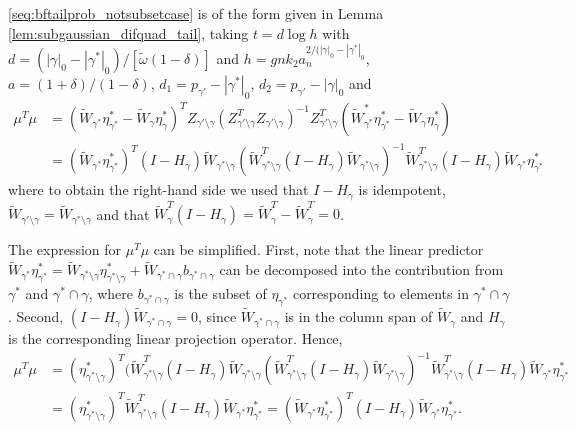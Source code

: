 \eqref{seq:bftailprob_notsubsetcase} is of the form given in Lemma \ref{lem:subgaussian_difquad_tail}, taking 
$t= d \log h$ with $d=(|\gamma|_0-|\gamma^*|_0)/[\tilde{\omega}(1-\delta)]$ and $h=gnk_2 a_n^{2/(|\gamma|_0-|\gamma^*|_0}$,
$a=(1+\delta)/(1-\delta)$, $d_1=p_{\gamma'}-|\gamma^*|_0$, $d_2=p_{\gamma'} - |\gamma|_0$ and
\begin{align}
 \mu^T\mu&= 
(\widetilde{W}_{\gamma^*} \eta_{\gamma^*}^* - \widetilde{W}_\gamma \eta_\gamma^*)^T Z_{\gamma' \setminus \gamma}
(Z_{\gamma' \setminus \gamma}^T Z_{\gamma' \setminus \gamma})^{-1} 
Z_{\gamma' \setminus \gamma}^T (\widetilde{W}_{\gamma^*}^* \eta_{\gamma^*}^* - \widetilde{W}_\gamma \eta_\gamma^*)
\nonumber \\
&=(\widetilde{W}_{\gamma^*} \eta_{\gamma^*}^*)^T (I-H_\gamma) \widetilde{W}_{\gamma^* \setminus \gamma}
(\widetilde{W}_{\gamma^* \setminus \gamma}^T (I- H_\gamma) \widetilde{W}_{\gamma^* \setminus \gamma})^{-1} 
\widetilde{W}_{\gamma^* \setminus \gamma}^T (I - H_\gamma) \widetilde{W}_{\gamma^*} \eta_{\gamma^*}^*
\nonumber
\end{align}
where to obtain the right-hand side we used that $I-H_\gamma$ is idempotent, $\widetilde{W}_{\gamma' \setminus \gamma}= \widetilde{W}_{\gamma^* \setminus \gamma}$ and that $\widetilde{W}_\gamma^T (I - H_\gamma)= \widetilde{W}_\gamma^T - \widetilde{W}_\gamma^T= 0$.

The expression for $\mu^T\mu$ can be simplified. First, note that the linear predictor $\widetilde{W}_{\gamma^*} \eta_{\gamma^*}^*= \widetilde{W}_{\gamma^* \setminus \gamma} \eta_{\gamma^* \setminus \gamma}^* + \widetilde{W}_{\gamma^* \cap \gamma} b_{\gamma^* \cap \gamma}$ can be decomposed into the contribution from $\gamma^*$ and $\gamma^* \cap \gamma$, where $b_{\gamma^* \cap \gamma}$ is the subset of $\eta_{\gamma^*}$ corresponding to elements in $\gamma^* \cap \gamma$.
Second, $(I - H_\gamma) \widetilde{W}_{\gamma^* \cap \gamma}=0$, since $\widetilde{W}_{\gamma^* \cap \gamma}$ is in the column span of $\widetilde{W}_\gamma$ and $H_\gamma$ is the corresponding linear projection operator. Hence,
\begin{align}
 \mu^T\mu&= (\eta_{\gamma^* \setminus \gamma}^*)^T (\widetilde{W}_{\gamma^*\setminus \gamma}^T (I-H_\gamma) \widetilde{W}_{\gamma^* \setminus \gamma}
(\widetilde{W}_{\gamma^* \setminus \gamma}^T (I- H_\gamma) \widetilde{W}_{\gamma^* \setminus \gamma})^{-1} 
\widetilde{W}_{\gamma^* \setminus \gamma}^T (I - H_\gamma) \widetilde{W}_{\gamma^*} \eta_{\gamma^*}^*
\nonumber \\
&= (\eta_{\gamma^* \setminus \gamma}^*)^T \widetilde{W}_{\gamma^* \setminus \gamma}^T (I - H_\gamma) \widetilde{W}_{\gamma^*} \eta_{\gamma^*}^*
= (\widetilde{W}_{\gamma^*} \eta_{\gamma^*}^*)^T (I - H_\gamma) \widetilde{W}_{\gamma^*} \eta_{\gamma^*}^*.
\label{seq:noncentrality_param}
\end{align}

